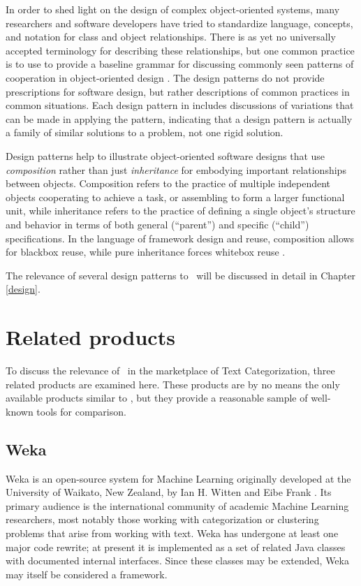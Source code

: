 In order to shed light on the design of complex object-oriented
systems, many researchers and software developers have tried to
standardize language, concepts, and notation for class and object
relationships.  There is as yet no universally accepted terminology
for describing these relationships, but one common practice is to use
 to provide a baseline grammar for
discussing commonly seen patterns of cooperation in object-oriented
design \cite[p. 3]{gamma:95}. The design patterns do not provide
prescriptions for software design, but rather descriptions of common
practices in common situations.  Each design pattern in \cite{gamma:95}
includes discussions of variations that can be made in applying
the pattern, indicating that a design pattern is actually a family of
similar solutions to a problem, not one rigid solution.

Design patterns help to illustrate object-oriented software designs
that use \emph{composition} rather than just \emph{inheritance} for
embodying important relationships between objects.  Composition refers
to the practice of multiple independent objects cooperating to achieve
a task, or assembling to form a larger functional unit, while
inheritance refers to the practice of defining a single object's
structure and behavior in terms of both general (``parent'') and
specific (``child'') specifications.  In the language of framework
design and reuse, composition allows for blackbox reuse, while pure
inheritance forces whitebox reuse \cite[p. 19]{gamma:95}.

The relevance of several design patterns to \aicat\ will be discussed
in detail in Chapter \ref{design}.

\section{Related products}

To discuss the relevance of \aicat\ in the marketplace of Text
Categorization, three related products are examined here.  These
products are by no means the only available products similar to
\aicat, but they provide a reasonable sample of well-known tools for
comparison.

\subsection{Weka}

Weka is an open-source system for Machine Learning originally
developed at the University of Waikato, New Zealand, by Ian H. Witten
and Eibe Frank \cite{weka:99}. Its primary
audience is the international community of academic Machine Learning
researchers, most notably those working with categorization or
clustering problems that arise from working with text.  Weka has
undergone at least one major code rewrite; at present it is
implemented as a set of related Java classes with documented internal
interfaces.  Since these classes may be extended, Weka may itself be considered a framework.

